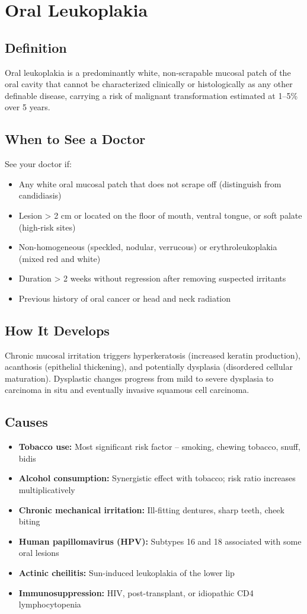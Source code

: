 \chapter{Oral Leukoplakia}

\section*{Definition}
Oral leukoplakia is a predominantly white, non-scrapable mucosal patch of the oral cavity that cannot be characterized clinically or histologically as any other definable disease, carrying a risk of malignant transformation estimated at 1--5\% over 5 years.

\section*{When to See a Doctor}
See your doctor if:
\begin{itemize}
  \item Any white oral mucosal patch that does not scrape off (distinguish from candidiasis)
  \item Lesion > 2 cm or located on the floor of mouth, ventral tongue, or soft palate (high-risk sites)
  \item Non-homogeneous (speckled, nodular, verrucous) or erythroleukoplakia (mixed red and white)
  \item Duration > 2 weeks without regression after removing suspected irritants
  \item Previous history of oral cancer or head and neck radiation
\end{itemize}

\section*{How It Develops}
Chronic mucosal irritation triggers hyperkeratosis (increased keratin production), acanthosis (epithelial thickening), and potentially dysplasia (disordered cellular maturation). Dysplastic changes progress from mild to severe dysplasia to carcinoma in situ and eventually invasive squamous cell carcinoma.

\section*{Causes}
\begin{itemize}
  \item \textbf{Tobacco use:} Most significant risk factor -- smoking, chewing tobacco, snuff, bidis
  \item \textbf{Alcohol consumption:} Synergistic effect with tobacco; risk ratio increases multiplicatively
  \item \textbf{Chronic mechanical irritation:} Ill-fitting dentures, sharp teeth, cheek biting
  \item \textbf{Human papillomavirus (HPV):} Subtypes 16 and 18 associated with some oral lesions
  \item \textbf{Actinic cheilitis:} Sun-induced leukoplakia of the lower lip
  \item \textbf{Immunosuppression:} HIV, post-transplant, or idiopathic CD4 lymphocytopenia
\end{itemize}

